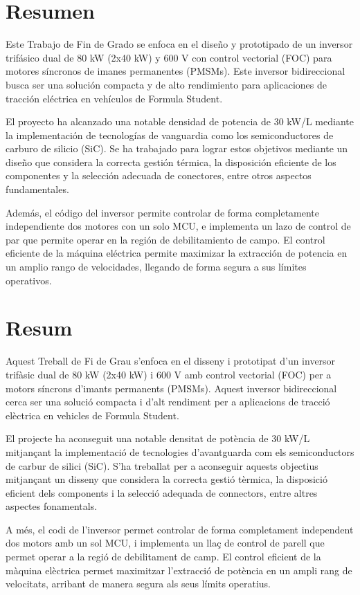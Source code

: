 \chapter*{Resumen}
Este Trabajo de Fin de Grado se enfoca en el diseño y prototipado de un inversor trifásico dual de 80 kW (2x40 kW) y 600 V con control vectorial (FOC) para motores síncronos de imanes permanentes (PMSMs). Este inversor bidireccional busca ser una solución compacta y de alto rendimiento para aplicaciones de tracción eléctrica en vehículos de Formula Student.

El proyecto ha alcanzado una notable densidad de potencia de 30 kW/L mediante la implementación de tecnologías de vanguardia como los semiconductores de carburo de silicio (SiC). Se ha trabajado para lograr estos objetivos mediante un diseño que considera la correcta gestión térmica, la disposición eficiente de los componentes y la selección adecuada de conectores, entre otros aspectos fundamentales.

Además, el código del inversor permite controlar de forma completamente independiente dos motores con un solo MCU, e implementa un lazo de control de par que permite operar en la región de debilitamiento de campo. El control eficiente de la máquina eléctrica permite maximizar la extracción de potencia en un amplio rango de velocidades, llegando de forma segura a sus límites operativos.

\chapter*{Resum}
Aquest Treball de Fi de Grau s'enfoca en el disseny i prototipat d'un inversor trifàsic dual de 80 kW (2x40 kW) i 600 V amb control vectorial (FOC) per a motors síncrons d'imants permanents (PMSMs). Aquest inversor bidireccional cerca ser una solució compacta i d'alt rendiment per a aplicacions de tracció elèctrica en vehicles de Formula Student.

El projecte ha aconseguit una notable densitat de potència de 30 kW/L mitjançant la implementació de tecnologies d'avantguarda com els semiconductors de carbur de silici (SiC). S'ha treballat per a aconseguir aquests objectius mitjançant un disseny que considera la correcta gestió tèrmica, la disposició eficient dels components i la selecció adequada de connectors, entre altres aspectes fonamentals.

A més, el codi de l'inversor permet controlar de forma completament independent dos motors amb un sol MCU, i implementa un llaç de control de parell que permet operar a la regió de debilitament de camp. El control eficient de la màquina elèctrica permet maximitzar l'extracció de potència en un ampli rang de velocitats, arribant de manera segura als seus límits operatius.

